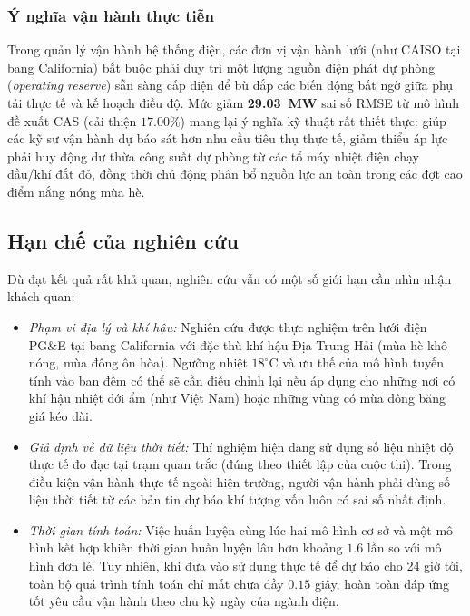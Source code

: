 \subsubsection{Ý nghĩa vận hành thực tiễn}
Trong quản lý vận hành hệ thống điện, các đơn vị vận hành lưới (như CAISO tại bang California) bắt buộc phải duy trì một lượng nguồn điện phát dự phòng (\textit{operating reserve}) sẵn sàng cấp điện để bù đắp các biến động bất ngờ giữa phụ tải thực tế và kế hoạch điều độ. Mức giảm \textbf{29.03~MW} sai số RMSE từ mô hình đề xuất CAS (cải thiện $17.00\%$) mang lại ý nghĩa kỹ thuật rất thiết thực: giúp các kỹ sư vận hành dự báo sát hơn nhu cầu tiêu thụ thực tế, giảm thiểu áp lực phải huy động dư thừa công suất dự phòng từ các tổ máy nhiệt điện chạy dầu/khí đắt đỏ, đồng thời chủ động phân bổ nguồn lực an toàn trong các đợt cao điểm nắng nóng mùa hè.

\subsection{Hạn chế của nghiên cứu}
\label{sec:limitations}

Dù đạt kết quả rất khả quan, nghiên cứu vẫn có một số giới hạn cần nhìn nhận khách quan:
\begin{itemize}
    \item \textit{Phạm vi địa lý và khí hậu:} Nghiên cứu được thực nghiệm trên lưới điện PG\&E tại bang California với đặc thù khí hậu Địa Trung Hải (mùa hè khô nóng, mùa đông ôn hòa). Ngưỡng nhiệt $18^\circ\text{C}$ và ưu thế của mô hình tuyến tính vào ban đêm có thể sẽ cần điều chỉnh lại nếu áp dụng cho những nơi có khí hậu nhiệt đới ẩm (như Việt Nam) hoặc những vùng có mùa đông băng giá kéo dài.
    \item \textit{Giả định về dữ liệu thời tiết:} Thí nghiệm hiện đang sử dụng số liệu nhiệt độ thực tế đo đạc tại trạm quan trắc (đúng theo thiết lập của cuộc thi). Trong điều kiện vận hành thực tế ngoài hiện trường, người vận hành phải dùng số liệu thời tiết từ các bản tin dự báo khí tượng vốn luôn có sai số nhất định.
    \item \textit{Thời gian tính toán:} Việc huấn luyện cùng lúc hai mô hình cơ sở và một mô hình kết hợp khiến thời gian huấn luyện lâu hơn khoảng $1.6$ lần so với mô hình đơn lẻ. Tuy nhiên, khi đưa vào sử dụng thực tế để dự báo cho 24 giờ tới, toàn bộ quá trình tính toán chỉ mất chưa đầy $0.15$ giây, hoàn toàn đáp ứng tốt yêu cầu vận hành theo chu kỳ ngày của ngành điện.
\end{itemize}
